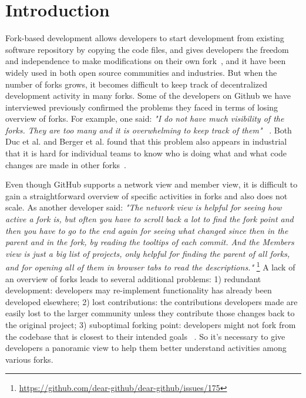 \section{Introduction}
Fork-based development allows developers to start development from existing software repository by copying the code files, and gives developers the freedom and independence to make modifications on their own fork~\cite{dubinsky2013exploratory, bitzer2006impact, ernst2010code,vetter2007open}, and it have been widely used in both open source communities and industries. But when the number of forks grows, it becomes difficult to keep track of decentralized development activity in many forks. Some of the developers on Github we have interviewed previously confirmed the problems they faced in terms of losing overview of forks. For example, one said: \emph{"I do not have much visibility of the forks. They are too many and it is overwhelming to keep track of them"} ~\cite{ZSLXWK:ICSE18}. Both Duc et al. and Berger et al. found that this problem also appears in industrial that it is hard for individual teams to know who is doing what and what code changes are made in other forks~\cite{berger2014three,Duc:2014:FCM:2652524.2652546}.

Even though GitHub supports a network view and member view, it is difficult to gain a straightforward overview of specific activities in forks and also does not scale. As another developer said: \emph{"The network view is helpful for seeing how active a fork is, but often you have to scroll back a lot to find the fork point and then you have to go to the end again for seeing what changed since then in the parent and in the fork, by reading the tooltips of each commit. And the Members view is just a big list of projects, only helpful for finding the parent of all forks, and for opening all of them in browser tabs to read the descriptions."} \footnote{\url{https://github.com/dear-github/dear-github/issues/175}}
 A lack of an overview of forks leads to several additional problems: 1) redundant development: developers may re-implement functionality has already been developed elsewhere; 2) lost contributions: the contributions developers made are easily lost to the larger community unless they contribute those changes back to the original project; 3) suboptimal forking point: developers might not fork from the codebase that is closest to their intended goals ~\cite{ZSLXWK:ICSE18, dubinsky2013exploratory,stanciulescu2015forked}. So it's necessary to give developers a panoramic view to help them better understand activities among various forks.

